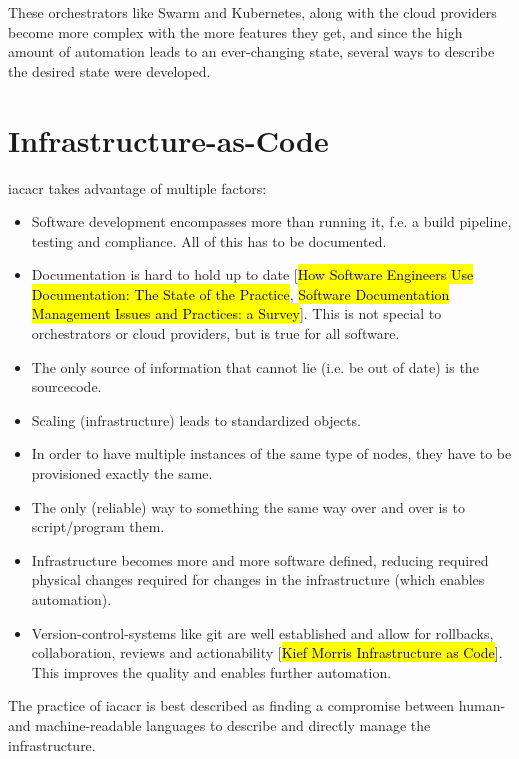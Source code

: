 \newline
These orchestrators like Swarm and Kubernetes, along with the cloud providers become more complex with the more features they get, and since the high amount of automation leads to an ever-changing state, several ways to describe the desired state were developed.



\section{Infrastructure-as-Code}
\Gls{iacacr} takes advantage of multiple factors:
\begin{itemize}
  \item Software development encompasses more than running it, f.e. a build pipeline, testing and compliance. All of this has to be documented.
  \item Documentation is hard to hold up to date [\hl{How Software Engineers Use Documentation: The State of the Practice}, \hl{Software Documentation Management Issues and Practices: a Survey}]. This is not special to orchestrators or cloud providers, but is true for all software.
  \item The only source of information that cannot lie (i.e. be out of date) is the sourcecode.
  \item Scaling (infrastructure) leads to standardized objects.
  \item In order to have multiple instances of the same type of nodes, they have to be provisioned exactly the same.
  \item The only (reliable) way to something the same way over and over is to script/program them.
  \item Infrastructure becomes more and more software defined, reducing required physical changes required for changes in the infrastructure (which enables automation).
  \item Version-control-systems like git are well established and allow for rollbacks, collaboration, reviews and actionability [\hl{Kief Morris Infrastructure as Code}]. This improves the quality and enables further automation.
\end{itemize}
The practice of \gls{iacacr} is best described as finding a compromise between human- and machine-readable languages to describe and directly manage the infrastructure.
